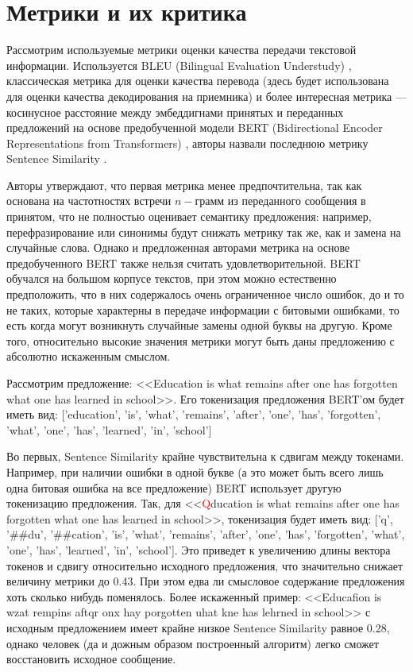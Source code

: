\documentclass[a4paper,12pt]{article}
\begin{document}
	\section*{Метрики и их критика}
	
	Рассмотрим используемые метрики оценки качества передачи текстовой информации. Используется BLEU (Bilingual Evaluation Understudy) \cite{papineli2002bleu}, классическая метрика для оценки качества перевода (здесь будет использована для оценки качества декодирования на приемника) и более интересная метрика --- косинусное расстояние между эмбеддигнами принятых и переданных предложений на основе предобученной модели BERT (Bidirectional Encoder Representations from Transformers) \cite{devlin2018bert}, авторы назвали последнюю метрику Sentence Similarity \cite{xie2021sem}. 
	
	Авторы утверждают, что первая метрика менее предпочтительна, так как основана на частотностях встречи $n-грамм$ из переданного сообщения в принятом, что не полностью оценивает семантику предложения: например, перефразирование или синонимы будут снижать метрику так же, как и замена на случайные слова.
	Однако и предложенная авторами метрика на основе предобученного BERT также нельзя считать удовлетворительной. BERT обучался на большом корпусе текстов, при этом можно естественно предположить, что в них содержалось очень ограниченное число ошибок, до и то не таких, которые характерны в передаче информации с битовыми ошибками, то есть когда могут возникнуть случайные замены одной буквы на другую. Кроме того, относительно высокие значения метрики могут быть даны предложению с абсолютно искаженным смыслом. 
	
	Рассмотрим предложение: <<Education is what remains after one has forgotten what one has learned in school>>. Его токенизация предложения BERT'ом будет иметь вид:  ['education',
	'is',
	'what',
	'remains',
	'after',
	'one',
	'has',
	'forgotten',
	'what',
	'one',
	'has',
	'learned',
	'in',
	'school']
	
	Во первых, Sentence Similarity крайне чувствительна к сдвигам между токенами. Например, при наличии ошибки в одной букве (а это может быть всего лишь одна битовая ошибка на все предложение) BERT использует другую токенизацию предложения. Так, для <<\textcolor{red}{Q}ducation is what remains after one has forgotten what one has learned in school>>, токенизация будет иметь вид: ['q',
	'\#\#du',
	'\#\#cation',
	'is',
	'what',
	'remains',
	'after',
	'one',
	'has',
	'forgotten',
	'what',
	'one',
	'has',
	'learned',
	'in',
	'school']. Это приведет к увеличению длины вектора токенов и сдвигу относительно исходного предложения, что значительно снижает величину метрики до 0.43. При этом едва ли смысловое содержание предложения хоть сколько нибудь поменялось. Более искаженный пример: <<Educafion is wzat rempins aftqr onx hay porgotten uhat kne has lehrned in school>>  с исходным предложением имеет крайне низкое Sentence Similarity равное 0.28, однако человек (да и дожным образом построенный алгоритм) легко сможет восстановить исходное сообщение.
	
\end{document}
